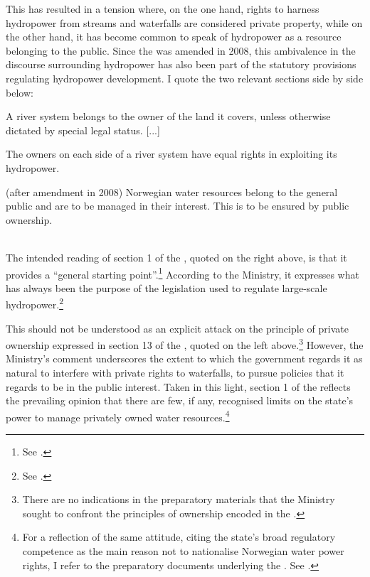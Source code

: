 This has resulted in a tension where, on the one hand, rights to harness hydropower from streams and waterfalls are considered private property, while on the other hand, it has become common to speak of hydropower as a resource belonging to the public. Since the \cite{ica17} was amended in 2008, this ambivalence in the discourse surrounding hydropower has also been part of the statutory provisions regulating hydropower development. I quote the two relevant sections side by side below:%

{\begin{minipage}[t]{16em}
 \begin{aquote}{\tiny {}\dni\cite[13]{wra00}} \footnotesize A river system belongs to the owner of the land it covers, unless otherwise dictated by special legal status. [...]

The owners on each side of a river system have equal rights in exploiting its hydropower.
\end{aquote}  
\end{minipage}}
{\begin{minipage}[t]{22em}
\begin{aquote}{\tiny {}\dni\cite[1]{ica17} (after amendment in 2008)} \footnotesize Norwegian water resources belong to the general public and are to be managed in their interest. This is to be ensured by public ownership.
\end{aquote}
\end{minipage}} \\

The intended reading of section 1 of the \cite{ica17}, quoted on the right above, is that it provides a ``general starting point''.\footnote{See \cite[72]{otprp61}.} According to the Ministry, it expresses what has always been the purpose of the legislation used to regulate large-scale hydropower.\footnote{See \cite[72]{otprp61}.} 

This should not be understood as an explicit attack on the principle of private ownership expressed in section 13 of the \cite{wra00}, quoted on the left above.\footnote{There are no indications in the preparatory materials that the Ministry sought to confront the principles of ownership encoded in the \cite{wra00}.} However, the Ministry's comment underscores the extent to which the government regards it as natural to interfere with private rights to waterfalls, to pursue policies that it regards to be in the public interest. Taken in this light, section 1 of the \cite{ica17} reflects the prevailing opinion that there are few, if any, recognised limits on the state's power to manage privately owned water resources.\footnote{For a reflection of the same attitude, citing the state's broad regulatory competence as the main reason not to nationalise Norwegian water power rights, I refer to the preparatory documents underlying the \cite{wra00}. See \cite[152-153]{nou94}.}

